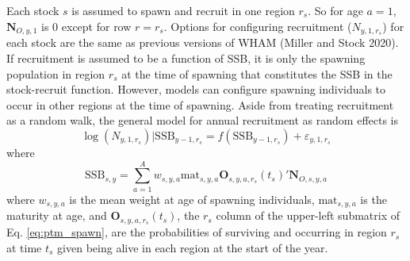 \documentclass[
]{article}
\begin{document}
Each stock \(s\) is assumed to spawn and recruit in one region \(r_s\).
So for age \(a=1\), \(\mathbf{N}_{O,y,1}\) is 0 except for row
\(r = r_s\). Options for configuring recruitment (\(N_{y,1,r_s}\)) for
each stock are the same as previous versions of WHAM (Miller and Stock
2020). If recruitment is assumed to be a function of SSB, it is only the
spawning population in region \(r_s\) at the time of spawning that
constitutes the SSB in the stock-recruit function. However, models can
configure spawning individuals to occur in other regions at the time of
spawning. Aside from treating recruitment as a random walk, the general
model for annual recruitment as random effects is \begin{equation*}
\log\left(N_{y,1,r_s}\right)|\text{SSB}_{y-1,r_s} =  f\left(\text{SSB}_{y-1,r_s}\right) + \varepsilon_{y,1,r_s}
\end{equation*} where\\
\[\text{SSB}_{s,y} =  \sum^A_{a=1}  w_{s,y,a} \text{mat}_{s,y,a} \mathbf{O}_{s,y,a,r_s}(t_s)' \mathbf{N}_{O,s,y,a}\]
where \(w_{s,y,a}\) is the mean weight at age of spawning individuals,
\(\text{mat}_{s,y,a}\) is the maturity at age, and
\(\mathbf{O}_{s,y,a,r_s}(t_s)\), the \(r_s\) column of the upper-left
submatrix of Eq. \ref{eq:ptm_spawn}, are the probabilities of surviving
and occurring in region \(r_s\) at time \(t_s\) given being alive in
each region at the start of the year.
\end{document}
